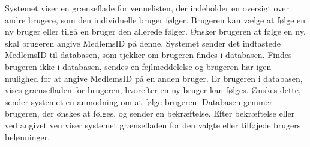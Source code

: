 \noindent
Systemet viser en grænseflade for vennelisten, der indeholder en oversigt over andre brugere, som den individuelle bruger følger. Brugeren kan vælge at følge en ny bruger eller tilgå en bruger den allerede følger. Ønsker brugeren at følge en ny, skal brugeren angive MedlemsID på denne. Systemet sender det indtastede MedlemsID til databasen, som tjekker om brugeren findes i databasen. Findes brugeren ikke i databasen, sendes en fejlmeddelelse og brugeren har igen mulighed for at angive MedlemsID på en anden bruger. Er brugeren i databasen, vises grænsefladen for brugeren, hvorefter en ny bruger kan følges. Ønskes dette, sender systemet en anmodning om at følge brugeren. Databasen gemmer brugeren, der ønskes at følges, og sender en bekræftelse. Efter bekræftelse eller ved angivet ven viser systemet grænsefladen for den valgte eller tilføjede brugers belønninger.

 





